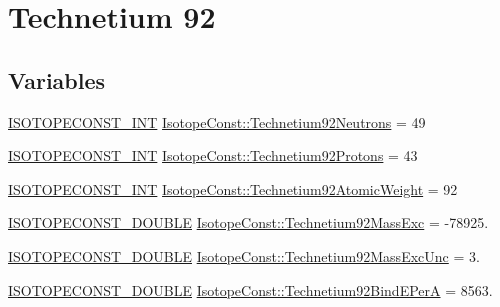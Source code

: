 \hypertarget{group___isotope_const-_technetium-_tc92}{}\section{Technetium 92}
\label{group___isotope_const-_technetium-_tc92}
\subsection*{Variables}
\begin{DoxyCompactItemize}
\item 
\mbox{\hyperlink{group___isotope_const-_macros_ga5f18360b3e99483a35c32d789e62621c}{I\+S\+O\+T\+O\+P\+E\+C\+O\+N\+S\+T\+\_\+\+I\+NT}} \mbox{\hyperlink{group___isotope_const-_technetium-_tc92_ga2b8da7657a382a0c2508af74567179a1}{Isotope\+Const\+::\+Technetium92\+Neutrons}} = 49
\item 
\mbox{\hyperlink{group___isotope_const-_macros_ga5f18360b3e99483a35c32d789e62621c}{I\+S\+O\+T\+O\+P\+E\+C\+O\+N\+S\+T\+\_\+\+I\+NT}} \mbox{\hyperlink{group___isotope_const-_technetium-_tc92_ga61c75d69a7d6558605424aa8ba3fcf55}{Isotope\+Const\+::\+Technetium92\+Protons}} = 43
\item 
\mbox{\hyperlink{group___isotope_const-_macros_ga5f18360b3e99483a35c32d789e62621c}{I\+S\+O\+T\+O\+P\+E\+C\+O\+N\+S\+T\+\_\+\+I\+NT}} \mbox{\hyperlink{group___isotope_const-_technetium-_tc92_ga519e6b94b131e93e29e00fc009f4e2f3}{Isotope\+Const\+::\+Technetium92\+Atomic\+Weight}} = 92
\item 
\mbox{\hyperlink{group___isotope_const-_macros_ga8f45a7272ce02c0b4c65c44636ed719a}{I\+S\+O\+T\+O\+P\+E\+C\+O\+N\+S\+T\+\_\+\+D\+O\+U\+B\+LE}} \mbox{\hyperlink{group___isotope_const-_technetium-_tc92_ga5d8d7d18dbe449c4c15ddc3a777719ce}{Isotope\+Const\+::\+Technetium92\+Mass\+Exc}} = -\/78925.
\item 
\mbox{\hyperlink{group___isotope_const-_macros_ga8f45a7272ce02c0b4c65c44636ed719a}{I\+S\+O\+T\+O\+P\+E\+C\+O\+N\+S\+T\+\_\+\+D\+O\+U\+B\+LE}} \mbox{\hyperlink{group___isotope_const-_technetium-_tc92_gadca3965565d9852bf898d1983e94fdfb}{Isotope\+Const\+::\+Technetium92\+Mass\+Exc\+Unc}} = 3.
\item 
\mbox{\hyperlink{group___isotope_const-_macros_ga8f45a7272ce02c0b4c65c44636ed719a}{I\+S\+O\+T\+O\+P\+E\+C\+O\+N\+S\+T\+\_\+\+D\+O\+U\+B\+LE}} \mbox{\hyperlink{group___isotope_const-_technetium-_tc92_ga3196859fd9f5e688224edbb128427cc2}{Isotope\+Const\+::\+Technetium92\+Bind\+E\+PerA}} = 8563.
\item 

\end{DoxyCompactItemize}
